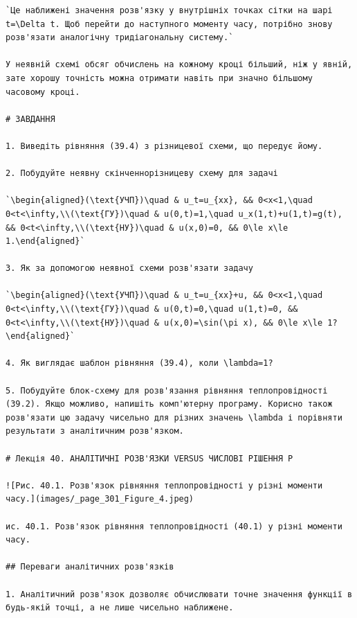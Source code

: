 \documentclass[
  ukrainian,
]{article}
\begin{document}
\begin{verbatim}
`Це наближені значення розв'язку у внутрішніх точках сітки на шарі t=\Delta t. Щоб перейти до наступного моменту часу, потрібно знову розв'язати аналогічну тридіагональну систему.`

У неявній схемі обсяг обчислень на кожному кроці більший, ніж у явній, зате хорошу точність можна отримати навіть при значно більшому часовому кроці.

# ЗАВДАННЯ

1. Виведіть рівняння (39.4) з різницевої схеми, що передує йому.

2. Побудуйте неявну скінченнорізницеву схему для задачі

`\begin{aligned}(\text{УЧП})\quad & u_t=u_{xx}, && 0<x<1,\quad 0<t<\infty,\\(\text{ГУ})\quad & u(0,t)=1,\quad u_x(1,t)+u(1,t)=g(t), && 0<t<\infty,\\(\text{НУ})\quad & u(x,0)=0, && 0\le x\le 1.\end{aligned}`

3. Як за допомогою неявної схеми розв'язати задачу

`\begin{aligned}(\text{УЧП})\quad & u_t=u_{xx}+u, && 0<x<1,\quad 0<t<\infty,\\(\text{ГУ})\quad & u(0,t)=0,\quad u(1,t)=0, && 0<t<\infty,\\(\text{НУ})\quad & u(x,0)=\sin(\pi x), && 0\le x\le 1?\end{aligned}`

4. Як виглядає шаблон рівняння (39.4), коли \lambda=1?

5. Побудуйте блок-схему для розв'язання рівняння теплопровідності (39.2). Якщо можливо, напишіть комп'ютерну програму. Корисно також розв'язати цю задачу чисельно для різних значень \lambda і порівняти результати з аналітичним розв'язком.

# Лекція 40. АНАЛІТИЧНІ РОЗВ'ЯЗКИ VERSUS ЧИСЛОВІ РІШЕННЯ Р

![Рис. 40.1. Розв'язок рівняння теплопровідності у різні моменти часу.](images/_page_301_Figure_4.jpeg)

ис. 40.1. Розв'язок рівняння теплопровідності (40.1) у різні моменти часу.

## Переваги аналітичних розв'язків

1. Аналітичний розв'язок дозволяє обчислювати точне значення функції в будь-якій точці, а не лише чисельно наближене.


\end{verbatim}
\end{document}
